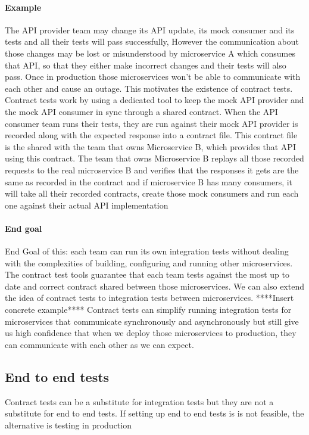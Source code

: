 \paragraph{Example}
The API provider team may change its API update, its mock consumer and its tests and all their tests will pass successfully,
However the communication about those changes may be lost or misunderstood by microservice A which consumes that API, so that they either make incorrect changes and their tests will also pass.
Once in production those microservices won't be able to communicate with each other and cause an outage.
This motivates the existence of contract tests.
Contract tests work by using a dedicated tool to keep the mock API provider and the mock API consumer in sync through a shared contract.
When the API consumer team runs their tests, they are run against their mock API provider is recorded along with the expected response into a contract file.
This contract file is the shared with the team that owns Microservice B, which provides that API using this contract.
The team that owns Microservice B replays all those recorded requests to the real microservice B and verifies that the responses it gets are the same as recorded in the contract and if microservice B has many consumers, it will take all their recorded contracts, create those mock consumers and run each one against their actual API implementation

\paragraph{End goal}
End Goal of this: each team can run its own integration tests without dealing with the complexities of building, configuring and running other microservices.
The contract test tools guarantee that each team tests against the most up to date and correct contract shared between those microservices.
We can also extend the idea of contract tests to integration tests between microservices. ****Insert concrete example****
Contract tests can simplify running integration tests for microservices that communicate synchronously and asynchronously but still give us high confidence that when we deploy those microservices to production, they can communicate with each other as we can expect.

\subsection{End to end tests}
Contract tests can be a substitute for integration tests but they are not a substitute for end to end tests.
If setting up end to end tests is is not feasible, the alternative is testing in production

